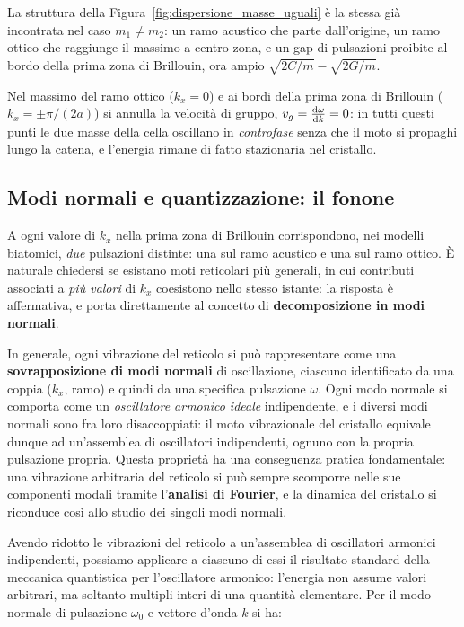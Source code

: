 La struttura della Figura~\ref{fig:dispersione_masse_uguali} è la stessa già incontrata nel caso \( m_1 \neq m_2 \): un ramo acustico che parte dall'origine, un ramo ottico che raggiunge il massimo a centro zona, e un gap di pulsazioni proibite al bordo della prima zona di Brillouin, ora ampio \( \sqrt{2C/m} - \sqrt{2G/m} \).

\begin{remark}
Nel massimo del ramo ottico (\( k_x = 0 \)) e ai bordi della prima zona di Brillouin (\( k_x = \pm \pi/(2a) \)) si annulla la velocità di gruppo, \( v_g = \dv{\omega}{k} = 0 \): in tutti questi punti le due masse della cella oscillano in \emph{controfase} senza che il moto si propaghi lungo la catena, e l'energia rimane di fatto stazionaria nel cristallo.    
\end{remark}



\subsection{Modi normali e quantizzazione: il fonone}

A ogni valore di \( k_x \) nella prima zona di Brillouin corrispondono, nei modelli biatomici, \emph{due} pulsazioni distinte: una sul ramo acustico e una sul ramo ottico. È naturale chiedersi se esistano moti reticolari più generali, in cui contributi associati a \emph{più valori} di \( k_x \) coesistono nello stesso istante: la risposta è affermativa, e porta direttamente al concetto di \textbf{decomposizione in modi normali}.

In generale, ogni vibrazione del reticolo si può rappresentare come una \textbf{sovrapposizione di modi normali} di oscillazione, ciascuno identificato da una coppia (\( k_x \), ramo) e quindi da una specifica pulsazione \( \omega \). Ogni modo normale si comporta come un \emph{oscillatore armonico ideale} indipendente, e i diversi modi normali sono fra loro disaccoppiati: il moto vibrazionale del cristallo equivale dunque ad un'assemblea di oscillatori indipendenti, ognuno con la propria pulsazione propria. Questa proprietà ha una conseguenza pratica fondamentale: una vibrazione arbitraria del reticolo si può sempre scomporre nelle sue componenti modali tramite l'\textbf{analisi di Fourier}, e la dinamica del cristallo si riconduce così allo studio dei singoli modi normali.

Avendo ridotto le vibrazioni del reticolo a un'assemblea di oscillatori armonici indipendenti, possiamo applicare a ciascuno di essi il risultato standard della meccanica quantistica per l'oscillatore armonico: l'energia non assume valori arbitrari, ma soltanto multipli interi di una quantità elementare. Per il modo normale di pulsazione \( \omega_0 \) e vettore d'onda \( k \) si ha:

